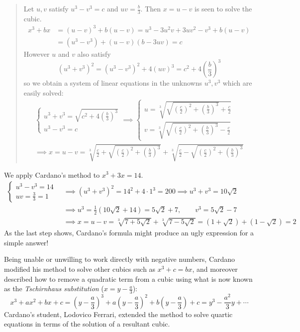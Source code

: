\begin{quote}
	Let $u,v$ satisfy $u^3-v^3=c$ and $uv=\frac{b}{3}$.
	Then $x=u-v$ is seen to solve the cubic.
	\begin{align*}
		x^3+bx&=(u-v)^3+b(u-v)=u^3-3u^2v+3uv^2-v^3+b(u-v)\\
		&=(u^3-v^3)+(u-v)(b-3uv)=c
	\end{align*}
	However $u$ and $v$ also satisfy
	\[
		(u^3+v^3)^2=(u^3-v^3)^2+4(uv)^3=c^2+4\left(\frac{b}{3}\right)^3
	\]
	so we obtain a system of linear equations in the unknowns $u^3,v^3$ which are easily solved:
	\begin{gather*}
		\begin{cases}
			u^3+v^3=\sqrt{c^2+4\left(\frac{b}{3}\right)^3}\\
			u^3-v^3=c
		\end{cases}
		\implies
		\begin{cases}
			u=\sqrt[3]{\sqrt{\left(\frac c2\right)^2+\left(\frac{b}{3}\right)^3}+\frac c2}\\
			v=\sqrt[3]{\sqrt{\left(\frac c2\right)^2+\left(\frac{b}{3}\right)^3}-\frac c2}
		\end{cases}
		\\
		\implies x=u-v
		=\sqrt[3]{
			\frac c2+\sqrt{\left(\frac c2\right)^2+\left(\frac{b}{3}\right)^3}
		}
		+\sqrt[3]{
			\frac c2-\sqrt{\left(\frac c2\right)^2+\left(\frac{b}{3}\right)^3}
		}
	\end{gather*}
\end{quote}


We apply Cardano's method to $x^3+3x=14$.
\begin{align*}
	\begin{cases}
		u^3-v^3=14\\
		uv=\frac 33=1
	\end{cases}\ 
	&\implies (u^3+v^3)^2=14^2+4\cdot 1^3=200 \implies u^3+v^3=10\sqrt 2\\
	&\implies u^3=\frac 12(10\sqrt 2+14)=5\sqrt 2+7,\qquad v^3=5\sqrt 2-7\\
	&\implies x=u-v=\sqrt[3]{7+5\sqrt 2}+\sqrt[3]{7-5\sqrt 2} =(1+\sqrt 2)+(1-\sqrt 2)=2
\end{align*}
As the last step shows, Cardano's formula might produce an ugly expression for a simple answer!
\bigbreak


Being unable or unwilling to work directly with negative numbers, Cardano modified his method to solve other cubics such as $x^3+c=bx$, and moreover described how to remove a quadratic term from a cubic using what is now known as the \emph{Tschirnhaus substitution} ($x=y-\frac a3$):
\[
	x^3+ax^2+bx+c =\left(y-\frac a3\right)^3+a\left(y-\frac a3\right)^2+b\left(y-\frac a3\right)+c =y^3-\frac{a^2}3y+\cdots \tag{$\ast$}
\]
Cardano's student, Lodovico Ferrari, extended the method to solve quartic equations in terms of the solution of a resultant cubic.

